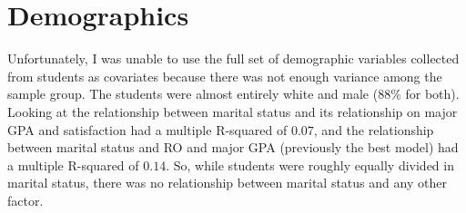 \section{Demographics}
Unfortunately, I was unable to use the full set of demographic variables collected from students as covariates because there was not enough variance among the sample group. The students were almost entirely white and male (88\% for both). Looking at the relationship between marital status and its relationship on major GPA and satisfaction had a multiple R-squared of $0.07$, and the relationship between marital status and RO and major GPA (previously the best model) had a multiple R-squared of $0.14$. So, while students were roughly equally divided in marital status, there was no relationship between marital status and any other factor.
